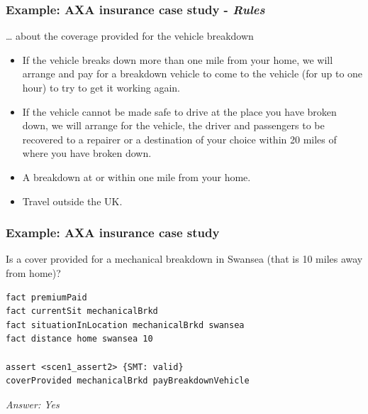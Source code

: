 \documentclass{beamer}
\begin{document}
\begin{frame}[fragile]\frametitle{Example: AXA insurance case study - \emph{Rules}}

  \dots{} about the coverage provided for the vehicle breakdown

  \begin{itemize}
  \item If the vehicle breaks down more than one mile from your home, we will
    arrange and pay for a breakdown vehicle to come to the vehicle (for up to
    one hour) to try to get it working again.
    
  \item If the vehicle cannot be made safe to drive at the place you have
    broken down, we will arrange for the vehicle, the driver and passengers to
    be recovered to a repairer or a destination of your choice within 20 miles
    of where you have broken down.
  \end{itemize}
  
  \begin{itemize}
  \item A breakdown at or within one mile from your home.  
  \item Travel outside the UK.  
  \end{itemize}


\end{frame}

\begin{frame}[fragile]\frametitle{Example: AXA insurance case study}

  
Is a cover provided for a mechanical breakdown in Swansea (that is 10 miles
away from home)?

\begin{lstlisting}
fact premiumPaid
fact currentSit mechanicalBrkd
fact situationInLocation mechanicalBrkd swansea
fact distance home swansea 10

assert <scen1_assert2> {SMT: valid} 
coverProvided mechanicalBrkd payBreakdownVehicle
\end{lstlisting}
\emph{Answer: Yes}

\end{frame}
\end{document}
